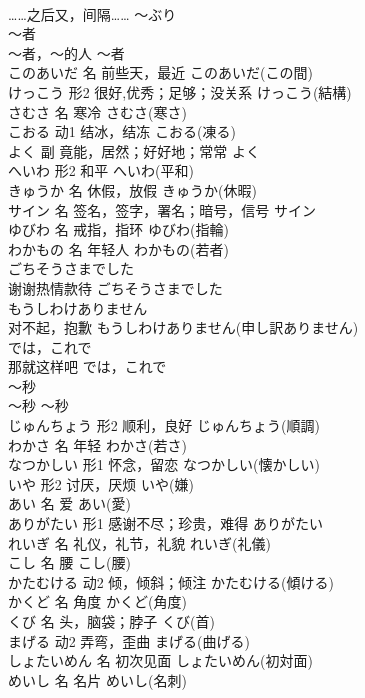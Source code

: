 \documentclass[8pt]{extreport}
\begin{document}
\begin{CJK}{UTF8}{min}
\\	……之后又，间隔……	～ぶり	
\\	～者	
\\	～者，～的人	～者	
\\	このあいだ	名	前些天，最近	このあいだ(この間)	
\\	けっこう	形2	很好,优秀；足够；没关系	けっこう(結構)	
\\	さむさ	名	寒冷	さむさ(寒さ)	
\\	こおる	动1	结冰，结冻	こおる(凍る)	
\\	よく	副	竟能，居然；好好地；常常	よく	
\\	へいわ	形2	和平	へいわ(平和)	
\\	きゅうか	名	休假，放假	きゅうか(休暇)	
\\	サイン	名	签名，签字，署名；暗号，信号	サイン	
\\	ゆびわ	名	戒指，指环	ゆびわ(指輪)	
\\	わかもの	名	年轻人	わかもの(若者)	
\\	ごちそうさまでした	
\\	谢谢热情款待	ごちそうさまでした	
\\	もうしわけありません	
\\	对不起，抱歉	もうしわけありません(申し訳ありません)	
\\	では，これで	
\\	那就这样吧	では，これで	
\\	～秒	
\\	～秒	～秒	
\\	じゅんちょう	形2	顺利，良好	じゅんちょう(順調)	
\\	わかさ	名	年轻	わかさ(若さ)	
\\	なつかしい	形1	怀念，留恋	なつかしい(懐かしい)	
\\	いや	形2	讨厌，厌烦	いや(嫌)	
\\	あい	名	爱	あい(愛)	
\\	ありがたい	形1	感谢不尽；珍贵，难得	ありがたい	
\\	れいぎ	名	礼仪，礼节，礼貌	れいぎ(礼儀)	
\\	こし	名	腰	こし(腰)	
\\	かたむける	动2	倾，倾斜；倾注	かたむける(傾ける)	
\\	かくど	名	角度	かくど(角度)	
\\	くび	名	头，脑袋；脖子	くび(首)	
\\	まげる	动2	弄弯，歪曲	まげる(曲げる)	
\\	しょたいめん	名	初次见面	しょたいめん(初対面)	
\\	めいし	名	名片	めいし(名刺)	

\end{CJK}
\end{document}
